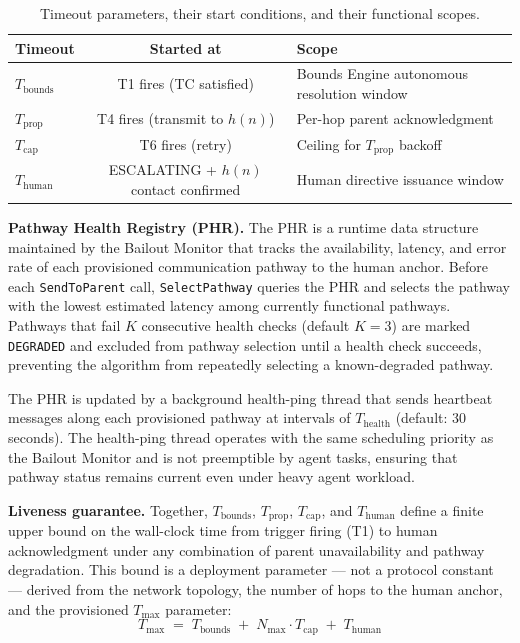 \begin{table}[htbp]
\caption{Timeout parameters, their start conditions, and their functional scopes.}
\label{tab:bailout-timeouts}
\begin{tabular}{@{}lcl@{}}
\toprule
\textbf{Timeout} & \textbf{Started at} & \textbf{Scope} \\
\midrule
$T_{\text{bounds}}$ & T1 fires (TC satisfied) & Bounds Engine autonomous resolution window \\
$T_{\text{prop}}$ & T4 fires (transmit to $h(n)$) & Per-hop parent acknowledgment \\
$T_{\text{cap}}$ & T6 fires (retry) & Ceiling for $T_{\text{prop}}$ backoff \\
$T_{\text{human}}$ & ESCALATING + $h(n)$ contact confirmed & Human directive issuance window \\
\bottomrule
\end{tabular}
\end{table}

\bigskip
\noindent\textbf{Pathway Health Registry (PHR).} The PHR is a runtime data structure maintained by the Bailout Monitor that tracks the availability, latency, and error rate of each provisioned communication pathway to the human anchor. Before each \texttt{SendToParent} call, \texttt{SelectPathway} queries the PHR and selects the pathway with the lowest estimated latency among currently functional pathways. Pathways that fail $K$ consecutive health checks (default $K = 3$) are marked \texttt{DEGRADED} and excluded from pathway selection until a health check succeeds, preventing the algorithm from repeatedly selecting a known-degraded pathway.

The PHR is updated by a background health-ping thread that sends heartbeat messages along each provisioned pathway at intervals of $T_{\text{health}}$ (default: 30 seconds). The health-ping thread operates with the same scheduling priority as the Bailout Monitor and is not preemptible by agent tasks, ensuring that pathway status remains current even under heavy agent workload.

\bigskip
\noindent\textbf{Liveness guarantee.} Together, $T_{\text{bounds}}$, $T_{\text{prop}}$, $T_{\text{cap}}$, and $T_{\text{human}}$ define a finite upper bound on the wall-clock time from trigger firing (T1) to human acknowledgment under any combination of parent unavailability and pathway degradation. This bound is a deployment parameter --- not a protocol constant --- derived from the network topology, the number of hops to the human anchor, and the provisioned $T_{\max}$ parameter:
\begin{equation}
T_{\max} \;=\; T_{\text{bounds}} \;+\; N_{\max} \cdot T_{\text{cap}} \;+\; T_{\text{human}} \tag{T-max}
\end{equation}


